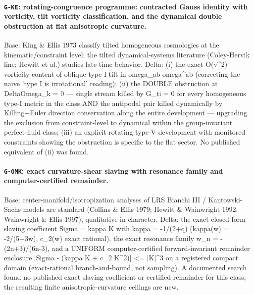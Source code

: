 \documentclass[10pt]{article}
\theoremstyle{definition}
\newcommand{\code}[1]{\texttt{\small #1}}
\begin{document}
\paragraph{\code{G-KE}: rotating-congruence programme: contracted Gauss identity with vorticity, tilt vorticity classification, and the dynamical double obstruction at flat anisotropic curvature.}
Base: King \& Ellis 1973 classify tilted homogeneous cosmologies at the kinematic/constraint level; the tilted dynamical-systems literature (Coley-Hervik line; Hewitt et al.) studies late-time behavior. Delta: (i) the exact O(v\^{}2) vorticity content of oblique type-I tilt in omega\_ab omega\^{}ab (correcting the naive 'type I is irrotational' reading); (ii) the DOUBLE obstruction at DeltaOmega\_k = 0 — single stream killed by G\_ti = 0 for every homogeneous type-I metric in the class AND the antipodal pair killed dynamically by Killing+Euler direction conservation along the entire development — upgrading the exclusion from constraint-level to dynamical within the group-invariant perfect-fluid class; (iii) an explicit rotating type-V development with monitored constraints showing the obstruction is specific to the flat sector. No published equivalent of (ii) was found.

\paragraph{\code{G-OMK}: exact curvature-shear slaving with resonance family and computer-certified remainder.}
Base: center-manifold/isotropization analyses of LRS Bianchi III / Kantowski-Sachs models are standard (Collins \& Ellis 1979; Hewitt \& Wainwright 1992; Wainwright \& Ellis 1997), qualitative in character. Delta: the exact closed-form slaving coefficient Sigma = kappa K with kappa = -1/(2+q) (kappa(w) = -2/(5+3w), c\_2(w) exact rational), the exact resonance family w\_n = -(2n+3)/(6n-3), and a UNIFORM computer-certified forward-invariant remainder enclosure |Sigma - (kappa K + c\_2 K\^{}2)| <= |K|\^{}3 on a registered compact domain (exact-rational branch-and-bound, not sampling). A documented search found no published exact slaving coefficient or certified remainder for this class; the resulting finite anisotropic-curvature ceilings are new.
\end{document}

